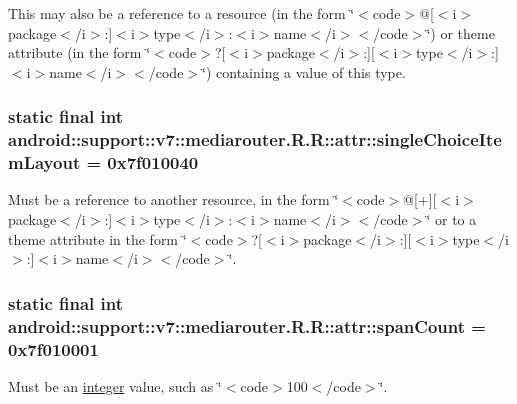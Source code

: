 This may also be a reference to a resource (in the form \char`\"{}$<$code$>$@\mbox{[}$<$i$>$package$<$/i$>$:\mbox{]}$<$i$>$type$<$/i$>$:$<$i$>$name$<$/i$>$$<$/code$>$\char`\"{}) or theme attribute (in the form \char`\"{}$<$code$>$?\mbox{[}$<$i$>$package$<$/i$>$:\mbox{]}\mbox{[}$<$i$>$type$<$/i$>$:\mbox{]}$<$i$>$name$<$/i$>$$<$/code$>$\char`\"{}) containing a value of this type. \hypertarget{classandroid_1_1support_1_1v7_1_1mediarouter_1_1_r_1_1attr_2a19b802039a35fb76bdc389a8b759b9}{
\subsubsection[{singleChoiceItemLayout}]{\setlength{\rightskip}{0pt plus 5cm}static final int android::support::v7::mediarouter.R.R::attr::singleChoiceItemLayout = 0x7f010040}}
\label{classandroid_1_1support_1_1v7_1_1mediarouter_1_1_r_1_1attr_2a19b802039a35fb76bdc389a8b759b9}


Must be a reference to another resource, in the form \char`\"{}$<$code$>$@\mbox{[}+\mbox{]}\mbox{[}$<$i$>$package$<$/i$>$:\mbox{]}$<$i$>$type$<$/i$>$:$<$i$>$name$<$/i$>$$<$/code$>$\char`\"{} or to a theme attribute in the form \char`\"{}$<$code$>$?\mbox{[}$<$i$>$package$<$/i$>$:\mbox{]}\mbox{[}$<$i$>$type$<$/i$>$:\mbox{]}$<$i$>$name$<$/i$>$$<$/code$>$\char`\"{}. \hypertarget{classandroid_1_1support_1_1v7_1_1mediarouter_1_1_r_1_1attr_c0b073e18c1b13155d0b408b6eaa1868}{
\subsubsection[{spanCount}]{\setlength{\rightskip}{0pt plus 5cm}static final int android::support::v7::mediarouter.R.R::attr::spanCount = 0x7f010001}}
\label{classandroid_1_1support_1_1v7_1_1mediarouter_1_1_r_1_1attr_c0b073e18c1b13155d0b408b6eaa1868}


Must be an \hyperlink{classandroid_1_1support_1_1v7_1_1mediarouter_1_1_r_1_1integer}{integer} value, such as \char`\"{}$<$code$>$100$<$/code$>$\char`\"{}. 

